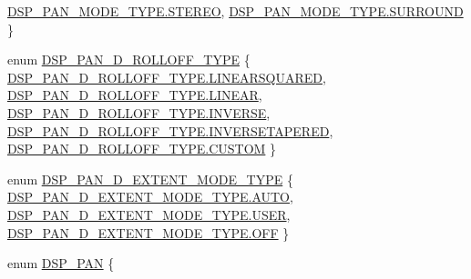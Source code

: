 \begin{DoxyCompactItemize}
\hyperlink{namespace_f_m_o_d_a87c9a310fe34aa45e053cfd0a21df38aa830dff3c27992cca35a4b46282e10530}{D\+S\+P\+\_\+\+P\+A\+N\+\_\+\+M\+O\+D\+E\+\_\+\+T\+Y\+P\+E.\+S\+T\+E\+R\+EO}, 
\hyperlink{namespace_f_m_o_d_a87c9a310fe34aa45e053cfd0a21df38aa866463fc14574fb21e0ef38a9057f317}{D\+S\+P\+\_\+\+P\+A\+N\+\_\+\+M\+O\+D\+E\+\_\+\+T\+Y\+P\+E.\+S\+U\+R\+R\+O\+U\+ND}
 \}
\item 
enum \hyperlink{namespace_f_m_o_d_aa8ce9494873e368660d4bf12f0330290}{D\+S\+P\+\_\+\+P\+A\+N\+\_\+D\+\_\+\+R\+O\+L\+L\+O\+F\+F\+\_\+\+T\+Y\+PE} \{ \newline
\hyperlink{namespace_f_m_o_d_aa8ce9494873e368660d4bf12f0330290a047cb1180a86dca107443b4597072cfb}{D\+S\+P\+\_\+\+P\+A\+N\+\_\+D\+\_\+\+R\+O\+L\+L\+O\+F\+F\+\_\+\+T\+Y\+P\+E.\+L\+I\+N\+E\+A\+R\+S\+Q\+U\+A\+R\+ED}, 
\hyperlink{namespace_f_m_o_d_aa8ce9494873e368660d4bf12f0330290aaac544aacc3615aada24897a215f5046}{D\+S\+P\+\_\+\+P\+A\+N\+\_\+D\+\_\+\+R\+O\+L\+L\+O\+F\+F\+\_\+\+T\+Y\+P\+E.\+L\+I\+N\+E\+AR}, 
\hyperlink{namespace_f_m_o_d_aa8ce9494873e368660d4bf12f0330290a1955bdc302911f376074eb9b02e56639}{D\+S\+P\+\_\+\+P\+A\+N\+\_\+D\+\_\+\+R\+O\+L\+L\+O\+F\+F\+\_\+\+T\+Y\+P\+E.\+I\+N\+V\+E\+R\+SE}, 
\hyperlink{namespace_f_m_o_d_aa8ce9494873e368660d4bf12f0330290a348129e3ef8f10b33f33ecccf4ce5299}{D\+S\+P\+\_\+\+P\+A\+N\+\_\+D\+\_\+\+R\+O\+L\+L\+O\+F\+F\+\_\+\+T\+Y\+P\+E.\+I\+N\+V\+E\+R\+S\+E\+T\+A\+P\+E\+R\+ED}, 
\newline
\hyperlink{namespace_f_m_o_d_aa8ce9494873e368660d4bf12f0330290a72baef04098f035e8a320b03ad197818}{D\+S\+P\+\_\+\+P\+A\+N\+\_\+D\+\_\+\+R\+O\+L\+L\+O\+F\+F\+\_\+\+T\+Y\+P\+E.\+C\+U\+S\+T\+OM}
 \}
\item 
enum \hyperlink{namespace_f_m_o_d_a3bfc126f1115edf364933e621c9a25aa}{D\+S\+P\+\_\+\+P\+A\+N\+\_\+D\+\_\+\+E\+X\+T\+E\+N\+T\+\_\+\+M\+O\+D\+E\+\_\+\+T\+Y\+PE} \{ \hyperlink{namespace_f_m_o_d_a3bfc126f1115edf364933e621c9a25aaae1f2d5134ed2543d38a0de9751cf75d9}{D\+S\+P\+\_\+\+P\+A\+N\+\_\+D\+\_\+\+E\+X\+T\+E\+N\+T\+\_\+\+M\+O\+D\+E\+\_\+\+T\+Y\+P\+E.\+A\+U\+TO}, 
\hyperlink{namespace_f_m_o_d_a3bfc126f1115edf364933e621c9a25aaa2e40ad879e955201df4dedbf8d479a12}{D\+S\+P\+\_\+\+P\+A\+N\+\_\+D\+\_\+\+E\+X\+T\+E\+N\+T\+\_\+\+M\+O\+D\+E\+\_\+\+T\+Y\+P\+E.\+U\+S\+ER}, 
\hyperlink{namespace_f_m_o_d_a3bfc126f1115edf364933e621c9a25aaa88559a0cfd8250c9d65970cc145c92d4}{D\+S\+P\+\_\+\+P\+A\+N\+\_\+D\+\_\+\+E\+X\+T\+E\+N\+T\+\_\+\+M\+O\+D\+E\+\_\+\+T\+Y\+P\+E.\+O\+FF}
 \}
\item 
enum \hyperlink{namespace_f_m_o_d_ae4d17026bdbdd31f1a84d8ce19616374}{D\+S\+P\+\_\+\+P\+AN} \{ \newline

\end{DoxyCompactItemize}
